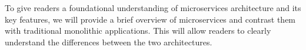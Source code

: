 To give readers a foundational understanding of microservices architecture and
its key features, we will provide a brief overview of microservices and
contrast them with traditional monolithic applications. This will allow readers
to clearly understand the differences between the two architectures.
